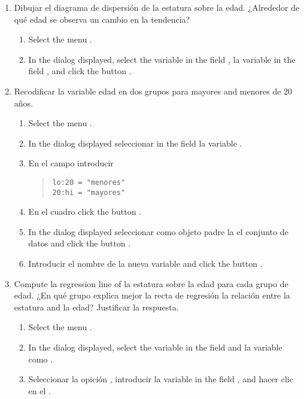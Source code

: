 \begin{enumerate}[leftmargin=*]
\begin{enumerate}
\item Dibujar el diagrama de dispersión de la estatura sobre la edad. 
¿Alrededor de qué edad se observa un cambio en la tendencia? 
\begin{indication}
\begin{enumerate}
\item Select the menu .
\item In the dialog displayed, select the variable  in the field ,
la variable  in the field , and click the button .
\end{enumerate}
\end{indication}

\item Recodificar la variable edad en dos grupos para mayores and menores de 20 años.
\begin{indication}
\begin{enumerate}
\item Select the menu .
\item In the dialog displayed seleccionar in the field  la variable
.
\item En el campo  introducir
\begin{quote}
\lstinline{lo:20 = "menores"}\\
\lstinline{20:hi = "mayores"}
\end{quote}
\item En el cuadro  click the button .
\item In the dialog displayed seleccionar como objeto padre la el conjunto de datos  and click the button .
\item Introducir el nombre de la nueva variable  and click the button .
\end{enumerate}
\end{indication}

\item Compute la regression line of la estatura sobre la edad para cada grupo de edad. 
¿En qué grupo explica mejor la recta de regresión la relación entre la estatura and la edad? 
Justificar la respuesta.
\begin{indication}
\begin{enumerate}
\item Select the menu .
\item In the dialog displayed, select the variable  in the field  and la variable  como .
\item Seleccionar la opición , introducir la variable  in the field
, and hacer clic en el .
\end{enumerate}
\end{indication}


\end{enumerate}
\end{enumerate}
